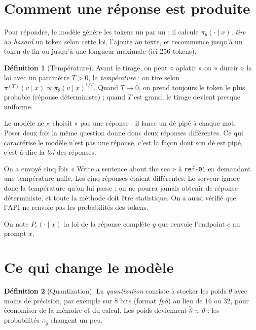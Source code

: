 \documentclass[11pt,a4paper]{report}
\theoremstyle{definition}
\newtheorem{definition}{Définition}[chapter]
\theoremstyle{plain}
\newcommand{\code}[1]{\texttt{#1}}
\begin{document}
\section{Comment une réponse est produite}

Pour répondre, le modèle génère les tokens un par un : il calcule $\pi_\theta(\cdot\mid x)$, \emph{tire au hasard} un token selon cette loi, l'ajoute au texte, et recommence jusqu'à un token de fin ou jusqu'à une longueur maximale (ici 256 tokens).

\begin{definition}[Température]
Avant le tirage, on peut « aplatir » ou « durcir » la loi avec un paramètre $T>0$, la \emph{température} : on tire selon $\pi^{(T)}(v\mid x) \propto \pi_\theta(v\mid x)^{1/T}$. Quand $T\to0$, on prend toujours le token le plus probable (réponse déterministe) ; quand $T$ est grand, le tirage devient presque uniforme.
\end{definition}

\begin{intuition}
Le modèle ne « choisit » pas une réponse : il lance un dé pipé à chaque mot. Poser deux fois la même question donne donc deux réponses différentes. Ce qui caractérise le modèle n'est pas une réponse, c'est la façon dont son dé est pipé, c'est-à-dire la \emph{loi} des réponses.
\end{intuition}

\begin{exemple}
On a envoyé cinq fois « Write a sentence about the sea » à \code{ref-01} en demandant une température nulle. Les cinq réponses étaient différentes. Le serveur ignore donc la température qu'on lui passe : on ne pourra jamais obtenir de réponse déterministe, et toute la méthode doit être statistique. On a aussi vérifié que l'API ne renvoie pas les probabilités des tokens.
\end{exemple}

On note $P_e(\cdot \mid x)$ la loi de la réponse complète $y$ que renvoie l'endpoint $e$ au prompt $x$.

\section{Ce qui change le modèle}

\begin{definition}[Quantization]
La \emph{quantization} consiste à stocker les poids $\theta$ avec moins de précision, par exemple sur 8 bits (format \emph{fp8}) au lieu de 16 ou 32, pour économiser de la mémoire et du calcul. Les poids deviennent $\tilde\theta \approx \theta$ : les probabilités $\pi_{\tilde\theta}$ changent un peu.
\end{definition}
\end{document}
